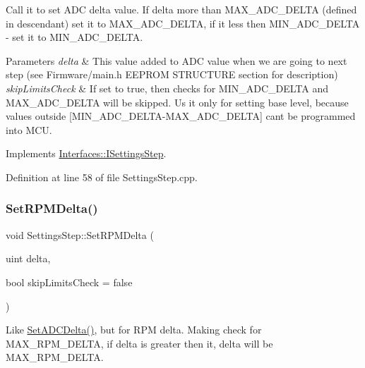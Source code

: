 Call it to set A\+DC delta value. If delta more than M\+A\+X\+\_\+\+A\+D\+C\+\_\+\+D\+E\+L\+TA (defined in descendant) set it to M\+A\+X\+\_\+\+A\+D\+C\+\_\+\+D\+E\+L\+TA, if it less then M\+I\+N\+\_\+\+A\+D\+C\+\_\+\+D\+E\+L\+TA -\/ set it to M\+I\+N\+\_\+\+A\+D\+C\+\_\+\+D\+E\+L\+TA. 


\begin{DoxyParams}{Parameters}
{\em delta} & This value added to A\+DC value when we are going to next step (see Firmware/main.\+h E\+E\+P\+R\+OM S\+T\+R\+U\+C\+T\+U\+RE section for description) \\
\hline
{\em skip\+Limits\+Check} & If set to true, then checks for M\+I\+N\+\_\+\+A\+D\+C\+\_\+\+D\+E\+L\+TA and M\+A\+X\+\_\+\+A\+D\+C\+\_\+\+D\+E\+L\+TA will be skipped. Us it only for setting base level, because values outside \mbox{[}M\+I\+N\+\_\+\+A\+D\+C\+\_\+\+D\+E\+L\+T\+A-\/\+M\+A\+X\+\_\+\+A\+D\+C\+\_\+\+D\+E\+L\+TA\mbox{]} can\textquotesingle{}t be programmed into M\+CU. \\
\hline
\end{DoxyParams}


Implements \hyperlink{class_interfaces_1_1_i_settings_step_a83f00b8b66f6566721065e34e41508c6}{Interfaces\+::\+I\+Settings\+Step}.



Definition at line 58 of file Settings\+Step.\+cpp.

\mbox{\label{class_settings_step_a25ddaf1d4d77727b8f87b5f8588f2de1}} 
\subsubsection{\texorpdfstring{Set\+R\+P\+M\+Delta()}{SetRPMDelta()}}
{\footnotesize\ttfamily void Settings\+Step\+::\+Set\+R\+P\+M\+Delta (\begin{DoxyParamCaption}\item[{uint}]{delta,  }\item[{bool}]{skip\+Limits\+Check = {\ttfamily false} }\end{DoxyParamCaption})\hspace{0.3cm}{\ttfamily [virtual]}}



Like \hyperlink{class_settings_step_a8124c87ae0b1d9fb3b623144d0e492db}{Set\+A\+D\+C\+Delta()}, but for R\+PM delta. Making check for M\+A\+X\+\_\+\+R\+P\+M\+\_\+\+D\+E\+L\+TA, if delta is greater then it, delta will be M\+A\+X\+\_\+\+R\+P\+M\+\_\+\+D\+E\+L\+TA. 



